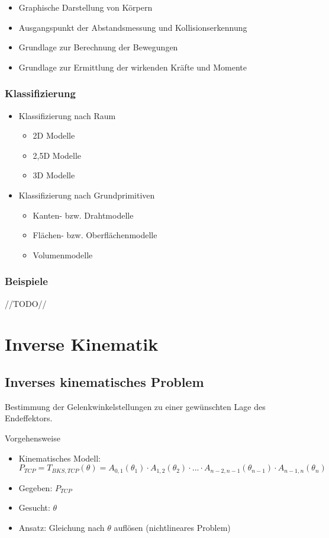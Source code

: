 \documentclass[paper=a4, fontsize=11pt]{scrartcl} %
\numberwithin{equation}{section} %
\numberwithin{figure}{section} %
\numberwithin{table}{section} %
\begin{document}
\begin{itemize}
\item Graphische Darstellung von Körpern
\item Ausgangspunkt der Abstandsmessung und Kollisionserkennung
\item Grundlage zur Berechnung der Bewegungen
\item Grundlage zur Ermittlung der wirkenden Kräfte und Momente
\end{itemize}

\subsubsection{Klassifizierung}

\begin{itemize}
\item Klassifizierung nach Raum
\begin{itemize}
\item 2D Modelle
\item 2,5D Modelle
\item 3D Modelle
\end{itemize}
\item Klassifizierung nach Grundprimitiven
\begin{itemize}
\item Kanten- bzw. Drahtmodelle
\item Flächen- bzw. Oberflächenmodelle
\item Volumenmodelle
\end{itemize}
\end{itemize}

\subsubsection{Beispiele}

//TODO//

\section{Inverse Kinematik}

\subsection{Inverses kinematisches Problem}

Bestimmung der Gelenkwinkelstellungen zu einer gewünschten Lage des Endeffektors.

Vorgehensweise
\begin{itemize}
\item Kinematisches Modell: $P_{TCP} = T_{BKS,TCP}(\theta) = A_{0,1}(\theta_1) \cdot A_{1,2}(\theta_2) \cdot ... \cdot A_{n-2,n-1}(\theta_{n-1}) \cdot A_{n-1,n}(\theta_n) $
\item Gegeben: $P_{TCP}$
\item Gesucht: $\theta$
\item Ansatz: Gleichung nach $\theta$ auflösen (nichtlineares Problem)
\end{itemize}
\end{document}
